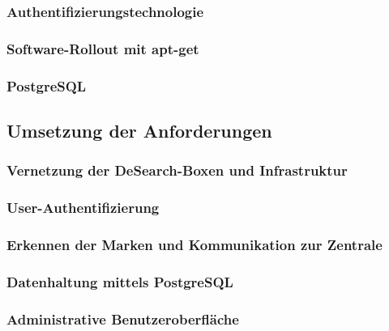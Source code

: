 \subsubsection{Authentifizierungstechnologie}
\subsubsection{Software-Rollout mit apt-get}
\subsubsection{PostgreSQL}


\subsection{Umsetzung der Anforderungen}

\subsubsection{Vernetzung der DeSearch-Boxen und Infrastruktur}
\subsubsection{User-Authentifizierung}
\subsubsection{Erkennen der Marken und Kommunikation zur Zentrale}
\subsubsection{Datenhaltung mittels PostgreSQL}
\subsubsection{Administrative Benutzeroberfläche}
